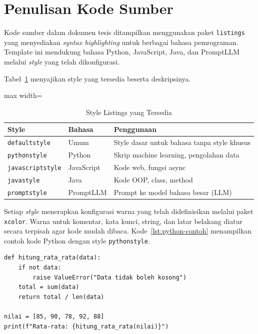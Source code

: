 \section{Penulisan Kode Sumber}

Kode sumber dalam dokumen tesis ditampilkan menggunakan paket \texttt{listings} yang menyediakan \textit{syntax highlighting} untuk berbagai bahasa pemrograman. Template ini mendukung bahasa Python, JavaScript, Java, dan PromptLLM melalui \textit{style} yang telah dikonfigurasi.

Tabel~\ref{tab:listings-style} menyajikan style yang tersedia beserta deskripsinya.

\begin{table}[h]
  \centering
  \caption{Style Listings yang Tersedia}
  \label{tab:listings-style}
  \begin{adjustbox}{max width=\textwidth}
  \begin{tabular}{lll}
    \toprule
    \textbf{Style} & \textbf{Bahasa} & \textbf{Penggunaan} \\
    \midrule
    \texttt{defaultstyle} & Umum & Style dasar untuk bahasa tanpa style khusus \\
    \texttt{pythonstyle} & Python & Skrip machine learning, pengolahan data \\
    \texttt{javascriptstyle} & JavaScript & Kode web, fungsi async \\
    \texttt{javastyle} & Java & Kode OOP, class, method \\
    \texttt{promptstyle} & PromptLLM & Prompt ke model bahasa besar (LLM) \\
    \bottomrule
  \end{tabular}
  \end{adjustbox}
\end{table}

Setiap \textit{style} menerapkan konfigurasi warna yang telah didefinisikan melalui paket \texttt{xcolor}. Warna untuk komentar, kata kunci, string, dan latar belakang diatur secara terpisah agar kode mudah dibaca. Kode~\ref{lst:python-contoh} menampilkan contoh kode Python dengan style \texttt{pythonstyle}.

\begin{lstlisting}[style=pythonstyle, caption={Contoh Fungsi Python}, label={lst:python-contoh}]
def hitung_rata_rata(data):
    if not data:
        raise ValueError("Data tidak boleh kosong")
    total = sum(data)
    return total / len(data)

nilai = [85, 90, 78, 92, 88]
print(f"Rata-rata: {hitung_rata_rata(nilai)}")
\end{lstlisting}

